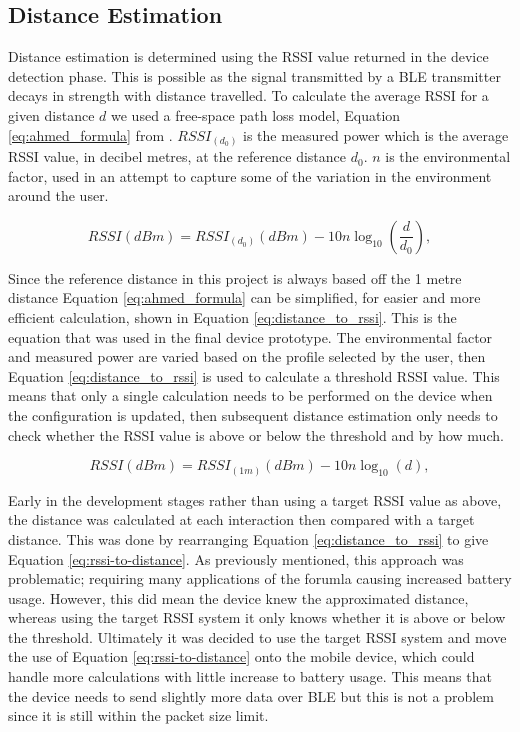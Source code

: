 \documentclass{l4proj}
\begin{document}
\subsection{Distance Estimation}

Distance estimation is determined using the RSSI value returned in the device detection phase. This is possible as the signal transmitted by a BLE transmitter decays in strength with distance travelled. To calculate the average RSSI for a given distance $d$ we used a free-space path loss model, Equation \ref{eq:ahmed_formula} from \citep{ahmed_survey_2020}. ${RSSI}_{(d_0)}$ is the measured power which is the average RSSI value, in decibel metres, at the reference distance $d_0$. $n$ is the environmental factor, used in an attempt to capture some of the variation in the environment around the user.

\begin{equation}
    {RSSI(dBm)}={RSSI}_{(d_0)}{(dBm)}-10n\log_{10}{(\frac{d}{d_0})},
    \label{eq:ahmed_formula}
\end{equation}

Since the reference distance in this project is always based off the 1 metre distance Equation \ref{eq:ahmed_formula} can be simplified, for easier and more efficient calculation, shown in Equation \ref{eq:distance_to_rssi}. This is the equation that was used in the final device prototype. The environmental factor and measured power are varied based on the profile selected by the user, then Equation \ref{eq:distance_to_rssi} is used to calculate a threshold RSSI value. This means that only a single calculation needs to be performed on the device when the configuration is updated, then subsequent distance estimation only needs to check whether the RSSI value is above or below the threshold and by how much.

\begin{equation}
    {RSSI(dBm)}={{RSSI}_{(1m)}{(dBm)}} - 10n\log_{10}{(d)},
    \label{eq:distance_to_rssi}
\end{equation}

Early in the development stages rather than using a target RSSI value as above, the distance was calculated at each interaction then compared with a target distance. This was done by rearranging Equation \ref{eq:distance_to_rssi} to give Equation \ref{eq:rssi-to-distance}. As previously mentioned, this approach was problematic; requiring many applications of the forumla causing increased battery usage. However, this did mean the device knew the approximated distance, whereas using the target RSSI system it only knows whether it is above or below the threshold. Ultimately it was decided to use the target RSSI system and move the use of Equation \ref{eq:rssi-to-distance} onto the mobile device, which could handle more calculations with little increase to battery usage. This means that the device needs to send slightly more data over BLE but this is not a problem since it is still within the packet size limit.
\end{document}

